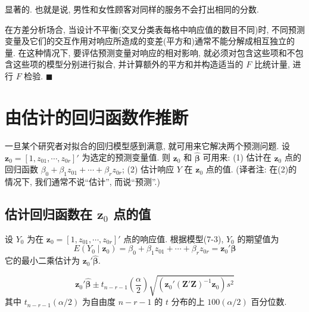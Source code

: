 
显著的. 也就是说, 男性和女性顾客对同样的服务不会打出相同的分数.

在方差分析场合, 当设计不平衡(交叉分类表每格中响应值的数目不同)时, 不同预测变量及它们的交互作用对响应所造成的变差(平方和)通常不能分解成相互独立的量. 在这种情况下, 要评估预测变量对响应的相对影响, 就必须对包含这些项和不包含这些项的模型分别进行拟合, 并计算额外的平方和并构造适当的 $F$ 比统计量, 进行 $F$ 检验. \hfill$\blacksquare$

\section{由估计的回归函数作推断}
\label{sec:7.5}

一旦某个研究者对拟合的回归模型感到满意, 就可用来它解决两个预测问题. 设 $\mathbf{z}_0=[1,z_{01},\cdots,z_{0r}]'$ 为选定的预测变量值. 则 $\mathbf{z}_0$ 和 $\hat{\boldsymbol{\beta}}$ 可用来: (1) 估计在 $\mathbf{z}_0$ 点的回归函数 $\beta_0+\beta_1z_{01}+\cdots+\beta_rz_{0r}$; (2) 估计响应 $Y$ 在 $\mathbf{z}_0$ 点的值. (译者注: 在(2)的情况下, 我们通常不说``估计'', 而说``预测''.)

\subsection{\texorpdfstring{估计回归函数在 $\mathbf{z}_0$ 点的值}{估计回归函数在 z0 点的值}}

设 $Y_0$ 为在 $\mathbf{z}_0=[1,z_{01},\cdots,z_{0r}]'$ 点的响应值. 根据模型(7-3), $Y_0$ 的期望值为
\label{eq:7-15}
\begin{equation}
E(Y_0\mid\mathbf{z}_0)=\beta_0+\beta_1z_{01}+\cdots+\beta_rz_{0r}=\mathbf{z}_0'\boldsymbol{\beta} \tag{7-15}
\end{equation}
它的最小二乘估计为 $\mathbf{z}_0'\hat{\boldsymbol{\beta}}$.

\[
\mathbf{z}_0'\hat{\boldsymbol{\beta}}\pm t_{n-r-1}\left(\frac{\alpha}{2}\right)\sqrt{\left(\mathbf{z}_0'(\mathbf{Z}'\mathbf{Z})^{-1}\mathbf{z}_0\right)s^2}
\]
其中 $t_{n-r-1}(\alpha/2)$ 为自由度 $n-r-1$ 的 $t$ 分布的上 $100(\alpha/2)$ 百分位数.

